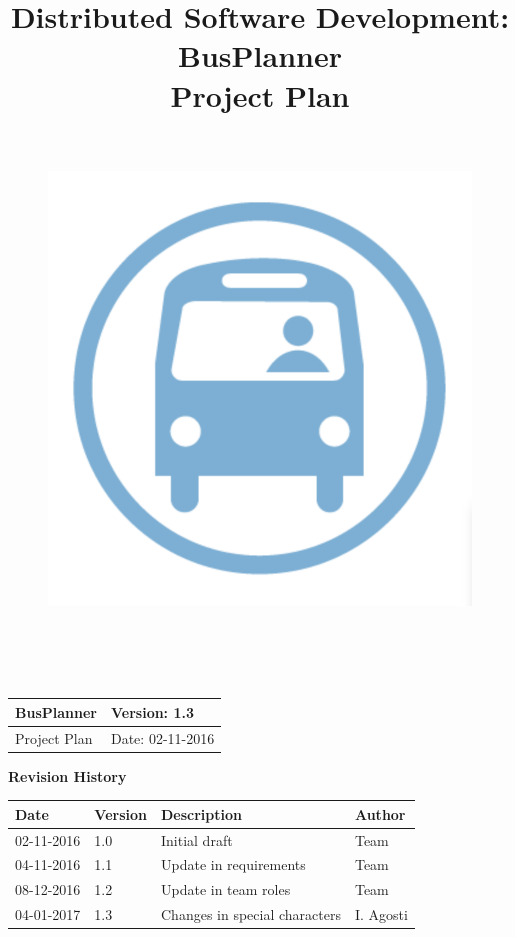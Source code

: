 \documentclass[a4paper, 12pt]{article}
\title{
	\textbf{D}istributed \textbf{S}oftware \textbf{D}evelopment: \textbf{BusPlanner}\\
	\textbf{Project Plan}\\
	\begin{figure}[H]
		\centering
		\includegraphics[width=13cm, height=13cm]{Bus_logo}
	\end{figure}
\date{}
}
\begin{document}
	\begin{table}[t]
		\centering
		\begin{tabular}{| m{6cm} | m{6cm} |}
			\hline
			BusPlanner & Version: 1.3\\
			\hline
			Project Plan & Date: 02-11-2016\\
			\hline
		\end{tabular}
	\end{table}
	\maketitle
	\begin{center}
		\textbf{\Large Revision History}
	\end{center}
	\begin{table}[h]
		\centering
		\begin{tabular}{| m{2cm} | m{2cm} | m{6cm} | m{2cm} |}
			\hline
			\textbf{Date} & \textbf{Version} & \textbf{Description} & \textbf{Author}\\
			\hline
			02-11-2016 & 1.0 & Initial draft & Team\\
			\hline
			04-11-2016 & 1.1 & Update in requirements & Team\\
			\hline
			08-12-2016 & 1.2 & Update in team roles & Team\\
			\hline
			04-01-2017 & 1.3 & Changes in special characters & I. Agosti\\
			\hline
		\end{tabular}
	\end{table}
\newpage
	\tableofcontents
	
	
	
	
	
	
	
\end{document}
